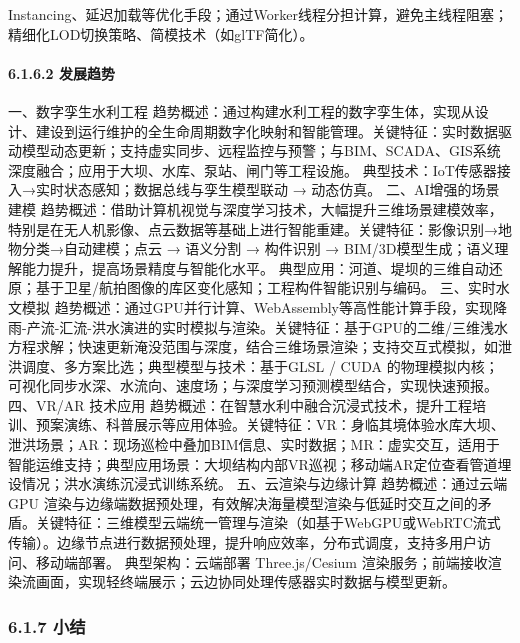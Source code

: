 Instancing、延迟加载等优化手段；通过Worker线程分担计算，避免主线程阻塞；精细化LOD切换策略、简模技术（如glTF简化）。 \paragraph{6.1.6.2 发展趋势}\label{ux53d1ux5c55ux8d8bux52bf} 一、数字孪生水利工程 趋势概述：通过构建水利工程的数字孪生体，实现从设计、建设到运行维护的全生命周期数字化映射和智能管理。关键特征：实时数据驱动模型动态更新；支持虚实同步、远程监控与预警；与BIM、SCADA、GIS系统深度融合；应用于大坝、水库、泵站、闸门等工程设施。 典型技术：IoT传感器接入→实时状态感知；数据总线与孪生模型联动 → 动态仿真。 二、AI增强的场景建模 趋势概述：借助计算机视觉与深度学习技术，大幅提升三维场景建模效率，特别是在无人机影像、点云数据等基础上进行智能重建。关键特征：影像识别→地物分类→自动建模；点云 → 语义分割 → 构件识别 → BIM/3D模型生成；语义理解能力提升，提高场景精度与智能化水平。 典型应用：河道、堤坝的三维自动还原；基于卫星/航拍图像的库区变化感知；工程构件智能识别与编码。 三、实时水文模拟 趋势概述：通过GPU并行计算、WebAssembly等高性能计算手段，实现降雨-产流-汇流-洪水演进的实时模拟与渲染。关键特征：基于GPU的二维/三维浅水方程求解；快速更新淹没范围与深度，结合三维场景渲染；支持交互式模拟，如泄洪调度、多方案比选；典型模型与技术：基于GLSL / CUDA 的物理模拟内核；可视化同步水深、水流向、速度场；与深度学习预测模型结合，实现快速预报。 四、VR/AR 技术应用 趋势概述：在智慧水利中融合沉浸式技术，提升工程培训、预案演练、科普展示等应用体验。关键特征：VR：身临其境体验水库大坝、泄洪场景；AR：现场巡检中叠加BIM信息、实时数据；MR：虚实交互，适用于智能运维支持；典型应用场景：大坝结构内部VR巡视；移动端AR定位查看管道埋设情况；洪水演练沉浸式训练系统。 五、云渲染与边缘计算 趋势概述：通过云端 GPU 渲染与边缘端数据预处理，有效解决海量模型渲染与低延时交互之间的矛盾。关键特征：三维模型云端统一管理与渲染（如基于WebGPU或WebRTC流式传输）。边缘节点进行数据预处理，提升响应效率，分布式调度，支持多用户访问、移动端部署。 典型架构：云端部署 Three.js/Cesium 渲染服务；前端接收渲染流画面，实现轻终端展示；云边协同处理传感器实时数据与模型更新。 \subsubsection{6.1.7 小结}\label{ux5c0fux7ed3} 